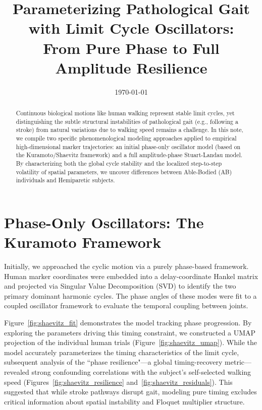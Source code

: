 \documentclass[11pt]{article}
\title{Parameterizing Pathological Gait with Limit Cycle Oscillators: \\ From Pure Phase to Full Amplitude Resilience}
\author{}
\date{\today}
\begin{document}
\maketitle

\begin{abstract}
Continuous biological motions like human walking represent stable limit cycles, yet distinguishing the subtle structural instabilities of pathological gait (e.g., following a stroke) from natural variations due to walking speed remains a challenge. In this note, we compile two specific phenomenological modeling approaches applied to empirical high-dimensional marker trajectories: an initial phase-only oscillator model (based on the Kuramoto/Shaevitz framework) and a full amplitude-phase Stuart-Landau model. By characterizing both the global cycle stability and the localized step-to-step volatility of spatial parameters, we uncover differences between Able-Bodied (AB) individuals and Hemiparetic subjects.
\end{abstract}

\section{Phase-Only Oscillators: The Kuramoto Framework}
Initially, we approached the cyclic motion via a purely phase-based framework. Human marker coordinates were embedded into a delay-coordinate Hankel matrix and projected via Singular Value Decomposition (SVD) to identify the two primary dominant harmonic cycles. The phase angles of these modes were fit to a coupled oscillator framework to evaluate the temporal coupling between joints.

Figure~\ref{fig:shaevitz_fit} demonstrates the model tracking phase progression. By exploring the parameters driving this timing constraint, we constructed a UMAP projection of the individual human trials (Figure~\ref{fig:shaevitz_umap}). While the model accurately parameterizes the timing characteristics of the limit cycle, subsequent analysis of the ``phase resilience"---a global timing-recovery metric---revealed strong confounding correlations with the subject's self-selected walking speed (Figures~\ref{fig:shaevitz_resilience} and~\ref{fig:shaevitz_residuals}). This suggested that while stroke pathways disrupt gait, modeling pure timing excludes critical information about spatial instability and Floquet multiplier structure.
\end{document}

